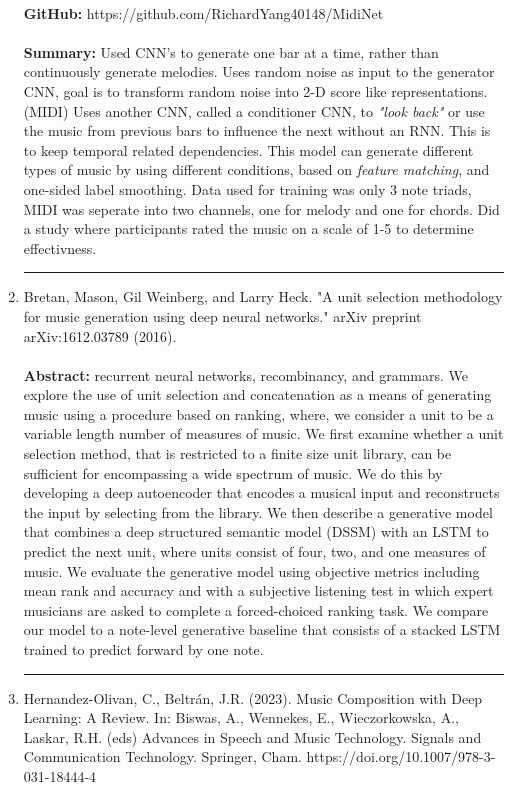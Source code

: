 \documentclass{article}
\begin{document}
\begin{enumerate}
    \\
    \textbf{GitHub:} https://github.com/RichardYang40148/MidiNet\\
    \\
    \textbf{Summary:} Used CNN's to generate one bar at a time, rather than continuously generate melodies. Uses random noise as input to the generator CNN, goal is to transform random noise into 2-D score like representations. (MIDI) Uses another CNN, called a conditioner CNN, to \textit{"look back"} or use the music from previous bars to influence the next without an RNN. This is to keep temporal related dependencies. This model can generate different types of music by using different conditions, based on \textit{feature matching}, and one-sided label smoothing. Data used for training was only 3 note triads, MIDI was seperate into two channels, one for melody and one for chords. Did a study where participants rated the music on a scale of 1-5 to determine effectivness.
\noindent\rule{\textwidth}{1pt}
    \item Bretan, Mason, Gil Weinberg, and Larry Heck. "A unit selection methodology for music generation using deep neural networks." arXiv preprint arXiv:1612.03789 (2016).\\
    \\
    \textbf{Abstract:} recurrent neural networks, recombinancy, and grammars. We explore the use of unit selection and
concatenation as a means of generating music using a procedure based on ranking, where, we consider
a unit to be a variable length number of measures of music. We first examine whether a unit selection
method, that is restricted to a finite size unit library, can be sufficient for encompassing a wide spectrum
of music. We do this by developing a deep autoencoder that encodes a musical input and reconstructs the
input by selecting from the library. We then describe a generative model that combines a deep structured
semantic model (DSSM) with an LSTM to predict the next unit, where units consist of four, two, and
one measures of music. We evaluate the generative model using objective metrics including mean rank
and accuracy and with a subjective listening test in which expert musicians are asked to complete a
forced-choiced ranking task. We compare our model to a note-level generative baseline that consists of
a stacked LSTM trained to predict forward by one note.\\
\noindent\rule{\textwidth}{1pt}
    \item Hernandez-Olivan, C., Beltrán, J.R. (2023). Music Composition with Deep Learning: A Review. In: Biswas, A., Wennekes, E., Wieczorkowska, A., Laskar, R.H. (eds) Advances in Speech and Music Technology. Signals and Communication Technology. Springer, Cham. https://doi.org/10.1007/978-3-031-18444-4\\

\end{enumerate}
\end{document}
